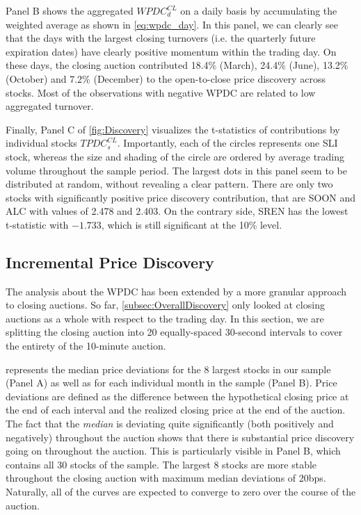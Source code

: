 \documentclass[11pt,a4paper, notitlepage]{article}
\begin{document}
	Panel B shows the aggregated $WPDC^{CL}_d$ on a daily basis by accumulating the weighted average as shown in \cref{eq:wpdc_day}. In this panel, we can clearly see that the days with the largest closing turnovers (i.e. the quarterly future expiration dates) have clearly positive momentum within the trading day. On these days, the closing auction contributed 18.4\% (March), 24.4\% (June), 13.2\% (October) and 7.2\% (December) to the open-to-close price discovery across stocks. Most of the observations with negative WPDC are related to low aggregated turnover.
	
	Finally, Panel C of \cref{fig:Discovery} visualizes the t-statistics of contributions by individual stocks $TPDC^{CL}_s$. Importantly, each of the circles represents one SLI stock, whereas the size and shading of the circle are ordered by average trading volume throughout the sample period. The largest dots in this panel seem to be distributed at random, without revealing a clear pattern. There are only two stocks with significantly positive price discovery contribution, that are SOON and ALC with values of 2.478 and 2.403. On the contrary side, SREN has the lowest t-statistic with $-1.733$, which is still significant at the 10\% level.
	
	\subsection{Incremental Price Discovery} \label{subsec:intervals}
	
	The analysis about the WPDC has been extended by a more granular approach to closing auctions. So far, \cref{subsec:OverallDiscovery} only looked at closing auctions as a whole with respect to the trading day. In this section, we are splitting the closing auction into 20 equally-spaced 30-second intervals to cover the entirety of the 10-minute auction.
	
	 represents the median price deviations for the 8 largest stocks in our sample (Panel A) as well as for each individual month in the sample (Panel B). Price deviations are defined as the difference between the hypothetical closing price at the end of each interval and the realized closing price at the end of the auction. The fact that the \emph{median} is deviating quite significantly (both positively and negatively) throughout the auction shows that there is substantial price discovery going on throughout the auction. This is particularly visible in Panel B, which contains all 30 stocks of the sample. The largest 8 stocks are more stable throughout the closing auction with maximum median deviations of 20bps. Naturally, all of the curves are expected to converge to zero over the course of the auction.
	
\end{document}
